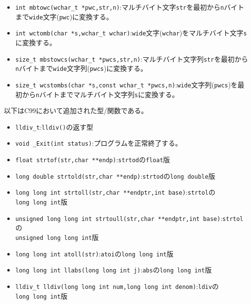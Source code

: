 \begin{itemize}
\item \verb|int mbtowc(wchar_t *pwc,str,n)|:マルチバイト文字\verb|str|を最初から\verb|n|バイトまで\verb|wide|文字(\verb|pwc|)に変換する。
\item \verb|int wctomb(char *s,wchar_t wchar)|:\verb|wide|文字(\verb|wchar|)をマルチバイト文字\verb|s|に変換する。
\item \verb|size_t mbstowcs(wchar_t *pwcs,str,n)|:マルチバイト文字列\verb|str|を最初から\verb|n|バイトまで\verb|wide|文字列(\verb|pwcs|)に変換する。
\item \verb|size_t wcstombs(char *s,const wchar_t *pwcs,n)|:\verb|wide|文字列(\verb|pwcs|)を最初から\verb|n|バイトまでマルチバイト文字列\verb|s|に変換する。
\end{itemize}
以下はC99において追加された型/関数である。
\begin{itemize}
\item \verb|lldiv_t|:\verb|lldiv()|の返す型
\item \verb|void _Exit(int status)|:プログラムを正常終了する。
\item \verb|float strtof(str,char **endp)|:\verb|strtod|の\verb|float|版
\item \verb|long double strtold(str,char **endp)|:\verb|strtod|の\verb|long double|版
\item \verb|long long int strtoll(str,char **endptr,int base)|:\verb|strtol|の\\ \verb|long long int|版
\item \verb|unsigned long long int strtoull(str,char **endptr,int base)|:\verb|strtol|の\\ \verb|unsigned long long int|版
\item \verb|long long int atoll(str)|:\verb|atoi|の\verb|long long int|版
\item \verb|long long int llabs(long long int j)|:\verb|abs|の\verb|long long int|版
\item \verb|lldiv_t lldiv(long long int num,long long int denom)|:\verb|ldiv|の\\ \verb|long long int|版
\end{itemize}

